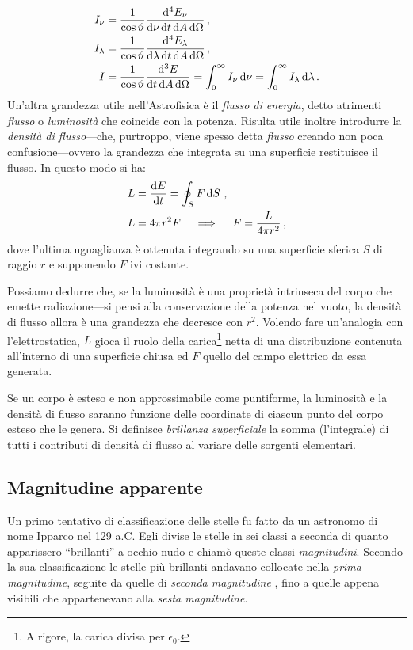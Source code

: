     \begin{align}
        I_\nu &= \frac{1}{\cos\vartheta}\frac{\dd[4] E_\nu}{\dd{\nu} \dd{t} \dd{A} \dd{\Omega}} \,, \\
        I_\lambda &= \frac{1}{\cos\vartheta}\frac{\dd[4] E_\lambda}{\dd{\lambda} \dd{t} \dd{A} \dd{\Omega}}
        \,, \\
        I &= \frac{1}{\cos\vartheta}\frac{\dd[3] E}{\dd t \dd{A} \dd{\Omega}}
        = \int_{0}^{\infty}I_\nu \,\dd\nu
        = \int_{0}^{\infty}I_\lambda \,\dd\lambda
        \,.
    \end{align}
    Un'altra grandezza utile nell'Astrofisica è il \emph{flusso di energia}, detto atrimenti \emph{flusso} o \emph{luminosità} che coincide con la potenza. Risulta utile inoltre introdurre la \emph{densità di flusso}---che, purtroppo, viene spesso detta \emph{flusso} creando non poca confusione---ovvero la grandezza che integrata su una superficie restituisce il flusso. In questo modo si ha:
    \begin{align}
        \label{eq:lumin-1}
        L &= \dv{E}{t} = \oint\nolimits_{S} F\dd{S} \,, \\
        \label{eq:lumin-2}
        L &= 4\pi r^2 F \quad \implies \quad F = \frac{L}{4\pi r^2}
        \,,
    \end{align}
    dove l'ultima uguaglianza è ottenuta integrando su una superficie sferica $S$ di raggio $r$ e supponendo $F$ ivi costante.

    Possiamo dedurre che, se la luminosità è una proprietà intrinseca del corpo che emette radiazione---si pensi alla conservazione della potenza nel vuoto, la densità di flusso allora è una grandezza che decresce con $r^2$. Volendo fare un'analogia con l'elettrostatica, $L$ gioca il ruolo della carica\footnote{A rigore, la carica divisa per $\epsilon_{0}$.} netta di una distribuzione contenuta all'interno di una superficie chiusa ed $F$ quello del campo elettrico da essa generata.

    Se un corpo è esteso e non approssimabile come puntiforme, la luminosità e la densità di flusso saranno funzione delle coordinate di ciascun punto del corpo esteso che le genera. Si definisce \emph{brillanza superficiale} la somma (l'integrale) di tutti i contributi di densità di flusso al variare delle sorgenti elementari.
    \subsection{Magnitudine apparente}
        Un primo tentativo di classificazione delle stelle fu fatto da un astronomo di nome Ipparco nel 129 a.C. Egli divise le stelle in sei classi a seconda di quanto apparissero ``brillanti'' a occhio nudo e chiamò queste classi \emph{magnitudini}. Secondo la sua classificazione le stelle più brillanti andavano collocate nella \emph{prima magnitudine}, seguite da quelle di \emph{seconda magnitudine} \myetc, fino a quelle appena visibili che appartenevano alla \emph{sesta magnitudine}.

